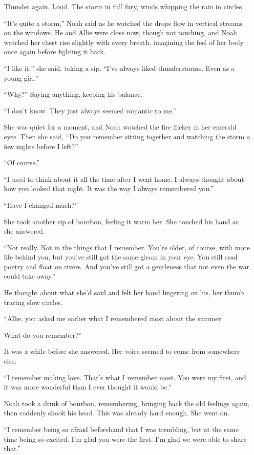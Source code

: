 \documentclass[10pt, twoside, openright]{book}
\begin{document}
Thunder again. Loud. The storm in full fury, winds whipping the rain in
circles.

``It's quite a storm,'' Noah said as he watched the drops flow in
vertical streams on the windows. He and Allie were close now, though not
touching, and Noah watched her chest rise slightly with every breath,
imagining the feel of her body once again before fighting it back.

``I like it,'' she said, taking a sip. ``I've always liked
thunderstorms. Even as a young girl.''


``Why?'' Saying anything, keeping his balance.

``I don't know. They just always seemed romantic to me.''


She was quiet for a moment, and Noah watched the fire flicker in her
emerald eyes. Then she said, ``Do you remember sitting together and
watching the storm a few nights before I left?''


``Of course.''


``I used to think about it all the time after I went home. I always
thought about how you looked that night. It was the way I always
remembered you.''


``Have I changed much?''


She took another sip of bourbon, feeling it warm her. She touched his
hand as she answered.

``Not really. Not in the things that I remember. You're older, of
course, with more life behind you, but you've still got the same gleam
in your eye. You still read poetry and float on rivers. And you've still
got a gentleness that not even the war could take away.''

He thought about what she'd said and felt her hand lingering on his, her
thumb tracing slow circles.


``Allie, you asked me earlier what I remembered most about the summer.


What do you remember?''

It was a while before she answered. Her voice seemed to come from
somewhere else.

``I remember making love. That's what I remember most. You were my
first, and it was more wonderful than I ever thought it would be.''

Noah took a drink of bourbon, remembering, bringing back the old
feelings again, then suddenly shook his head. This was already hard
enough. She went on.

``I remember being so afraid beforehand that I was trembling, but at the
same time being so excited. I'm glad you were the first. I'm glad we
were able to share that.''
\end{document}
